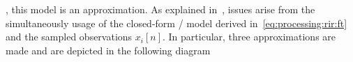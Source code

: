 , this model is an approximation.
As explained in~, issues arise from the simultaneously usage of the closed-form \RIR/ model derived in~\cref{eq:processing:rir:ft}
and the sampled observations $x_i[n]$. In particular, three approximations are made and are depicted in the following diagram

\begin{figure}[!h]
    \begin{fullwidthfig}
    \centering


    \begin{tikzpicture}[x=0.75pt,y=0.75pt,yscale=-1,xscale=1]


\end{tikzpicture}
\end{fullwidthfig}
\end{figure}
